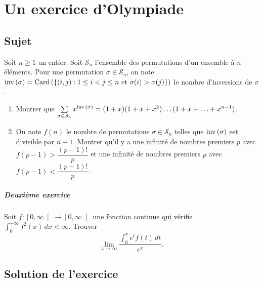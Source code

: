 \chapter{Un exercice d'Olympiade}

\section{Sujet}

Soit \( n \geq 1 \) un entier. Soit \( \mathcal S_n \) l'ensemble des permutations d'un ensemble à \( n \) éléments. Pour une permutation \( \sigma \in \mathcal S_n \), on note \( \text{inv\,}(\sigma) = \text{Card\,}(\{(i, j) : 1 \leq i < j \leq n \text{ et } \sigma(i) > \sigma(j)\}) \) le nombre d'inversions de \( \sigma \). 
\begin{enumerate}
\item  Montrer que \( \sum\limits_{\sigma \in \mathcal S_n} x^{\text{inv\,}(\sigma)} = 
(1+x) (1+x + x^2) \ldots (1+x + \ldots + x^{n-1}) \). 
\item  On note \( f(n) \) le nombre de permutations \( \sigma \in \mathcal S_n \) telles que \( \text{inv\,}(\sigma) \) est divisible par \( n + 1 \). Montrer qu'il y a une infinité de nombres premiers \( p \) avec \( f (p-1) > \dfrac{(p-1)!}{p} \) et une infinité 
de nombres premiers \( p \) avec \( f (p-1) < \dfrac{(p-1)!}{p} \).
\end{enumerate}

\paragraph{Deuxième exercice}

Soit $f : \left[0,\infty\right[ \to \left[0,\infty\right[$ une fonction continue qui vérifie $\int_0^{+\infty} f^2(x)\,dx < \infty$.
Trouver
\[
\lim_{x\to\infty} \frac{\int_0^x e^t f(t)\,dt}{e^x}.
\]

\section{Solution de l'exercice}

